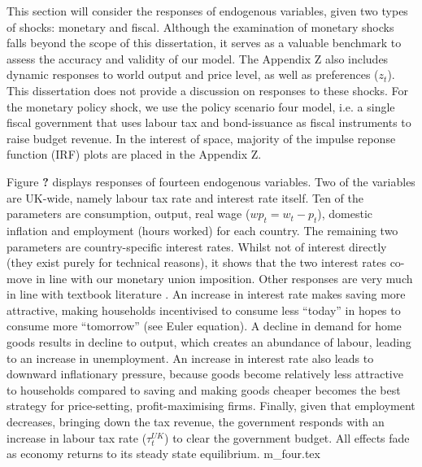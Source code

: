 This section will consider the responses of endogenous variables, given two types of shocks: monetary and fiscal. Although the examination of monetary shocks falls beyond the scope of this dissertation, it serves as a valuable benchmark to assess the accuracy and validity of our model. The Appendix Z also includes dynamic responses to world output and price level, as well as preferences ($z_t$). This dissertation does not provide a discussion on responses to these shocks. For the monetary policy shock, we use the policy scenario four model, i.e. a single fiscal government that uses labour tax and bond-issuance as fiscal instruments to raise budget revenue. In the interest of space, majority of the impulse reponse function (IRF) plots are placed in the Appendix Z. 

Figure \textbf{?} displays responses of fourteen endogenous variables. Two of the variables are UK-wide, namely labour tax rate and interest rate itself. Ten of the parameters are consumption, output, real wage ($wp_t = w_t - p_t$), domestic inflation and employment (hours worked) for each country. The remaining two parameters are country-specific interest rates. Whilst not of interest directly (they exist purely for technical reasons), it shows that the two interest rates co-move in line with our monetary union imposition. Other responses are very much in line with textbook literature \textcolor{red}{\parencite{jordigal_2015_monetary}}. An increase in interest rate makes saving more attractive, making households incentivised to consume less ``today'' in hopes to consume more ``tomorrow'' (see Euler equation). A decline in demand for home goods results in decline to output, which creates an abundance of labour, leading to an increase in unemployment. An increase in interest rate also leads to downward inflationary pressure, because goods become relatively less attractive to households compared to saving and making goods cheaper becomes the best strategy for price-setting, profit-maximising firms. Finally, given that employment decreases, bringing down the tax revenue, the government responds with an increase in labour tax rate ($\tau^{UK}_t$) to clear the government budget. All effects fade as economy returns to its steady state equilibrium.
{m_four.tex}

